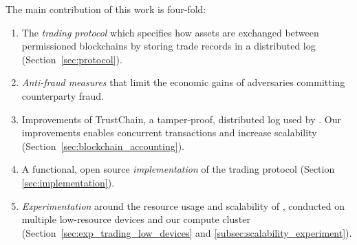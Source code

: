 
The main contribution of this work is four-fold:
\begin{enumerate}
	\item The \ModelName{} \emph{trading protocol} which specifies how assets are exchanged between permissioned blockchains by storing trade records in a distributed log (Section~\ref{sec:protocol}).
	\item \emph{Anti-fraud measures} that limit the economic gains of adversaries committing counterparty fraud.
	\item Improvements of TrustChain, a tamper-proof, distributed log used by \ModelName{}. Our improvements enables concurrent transactions and increase scalability (Section~\ref{sec:blockchain_accounting}).
	\item A functional, open source \emph{implementation} of the \ModelName{} trading protocol (Section \ref{sec:implementation}).
	\item \emph{Experimentation} around the resource usage and scalability of \ModelName{}, conducted on multiple low-resource devices and our compute cluster (Section~\ref{sec:exp_trading_low_devices} and \ref{subsec:scalability_experiment}).
\end{enumerate}

